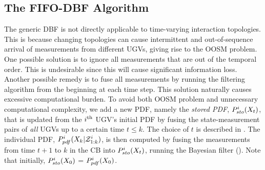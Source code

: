 	\subsection{The FIFO-DBF Algorithm}
	The generic DBF is not directly applicable to time-varying interaction topologies. 
	This is because changing topologies can cause intermittent and out-of-sequence arrival of measurements from different UGVs, giving rise to the OOSM problem.
	One possible solution is to ignore all measurements that are out of the temporal order.
	This is undesirable since this will cause significant information loss.
	Another possible remedy is to fuse all measurements by running the filtering algorithm from the beginning at each time step.
	This solution naturally causes excessive computational burden.
	To avoid both OOSM problem and unnecessary computational complexity, we add a new PDF, namely the \textit{stored PDF}, $P^{i}_{sto}(X_t)$, that is updated from the $i^\text{th}$ UGV's initial PDF by fusing the state-measurement pairs of \textit{all} UGVs up to a certain time $t\le k$.
	The choice of $t$ is described in .
	The individual PDF, $P^i_{pdf}(X_k|\mathcal{Z}^i_{1:k})$, is then computed by fusing the measurements from time $t+1$ to $k$ in the CB into $P^i_{sto}(X_t)$, running the Bayesian filter ().
	Note that initially, $P^{i}_{sto}(X_0)$ = $P^i_{pdf}(X_0)$.
	
